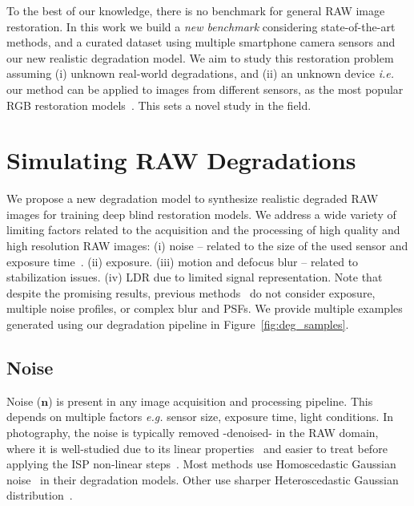 \documentclass{article}
\newcommand{\ie}{\emph{i.e.} }
\newcommand{\eg}{\emph{e.g.} }
\begin{document}

To the best of our knowledge, there is no benchmark for general RAW image restoration. In this work we build a \emph{new benchmark} considering state-of-the-art methods, and a curated dataset using multiple smartphone camera sensors and our new realistic degradation model. 
%
We aim to study this restoration problem assuming (i) unknown real-world degradations, and (ii) an unknown device \ie our method can be applied to images from different sensors, as the most popular RGB restoration models~\cite{kai2021bsrgan, zamir2022restormer,chen2022simple}. This sets a novel study in the field.

\section{Simulating RAW Degradations}
\label{sec:method}

We propose a new degradation model to synthesize realistic degraded RAW images for training deep blind restoration models. We address a wide variety of limiting factors related to the acquisition and the processing of high quality and high resolution RAW images: (i) noise -- related to the size of the used sensor and exposure time~\cite{karaimer2016software}. (ii) exposure. (iii) motion and defocus blur -- related to stabilization issues. (iv) LDR due to limited signal representation. 
Note that despite the promising results, previous methods~\cite{xu2019rawsr, xu2020exploiting} do not consider exposure, multiple noise profiles, or complex blur and PSFs. We provide multiple examples generated using our degradation pipeline in Figure~\ref{fig:deg_samples}.


\subsection{Noise}
\label{section:noise}

Noise ($\mathbf{n}$) is present in any image acquisition and processing pipeline. This depends on multiple factors \eg sensor size, exposure time, light conditions. In photography, the noise is typically removed -denoised- in the RAW domain, where it is well-studied due to its linear properties~\cite{hasinoff2014photon, hasinoff2016burst, abdelhamed2018high, brooks2019unprocessing} and easier to treat before applying the ISP non-linear steps~\cite{karaimer2016software}.
%
Most methods use Homoscedastic Gaussian noise~\cite{kai2021bsrgan, kai2017dncnn, zhang2021DPIR} in their degradation models. Other use sharper Heteroscedastic Gaussian distribution~\cite{abdelhamed2018high, xu2019rawsr}.
\end{document}
